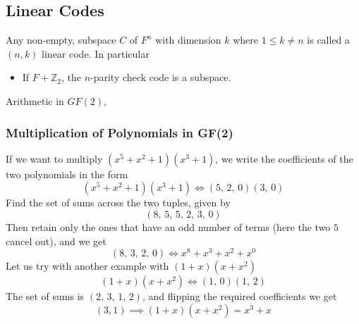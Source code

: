 \documentclass[../../main.tex]{subfiles}
\begin{document}
\subsection{Linear Codes}
Any non-empty, subspace $C$ of $F^n$ with dimension $k$ where $1\leq k\neq n$ is called a $(n,k)$ linear code. In particular
\begin{itemize}
    \item If $F+\mathbb{Z}_2$, the $n$-parity check code is a subspace.
\end{itemize}

Arithmetic in $GF(2)$, 
\subsubsection{Multiplication of Polynomials in GF(2)}
If we want to multiply $(x^5 + x^2 + 1)(x^3+1)$, we write the coefficients of the two polynomials in the form
\[
(x^5 + x^2 + 1)(x^3+1)\iff (5,\,2,\,0)(3,\,0)
\]
Find the set of sums across the two tuples, given by
\[
(8,\,5,\,5,\,2,\,3,\,0)
\]
Then retain only the ones that have an odd number of terms (here the two $5$ cancel out), and we get
\[
(8,\,3,\,2,\,0)\iff x^8 + x^3 + x^2 + x^0
\]
Let us try with another example with $(1+x)(x+x^2)$
\[
(1+x)(x+x^2)\iff (1,\,0)(1,\,2)
\]
The set of sums is $(2,\,3,\,1,\,2)$, and flipping the required coefficients we get
\[
(3,1)\implies (1+x)(x+x^2) = x^3 + x
\]
\end{document}
